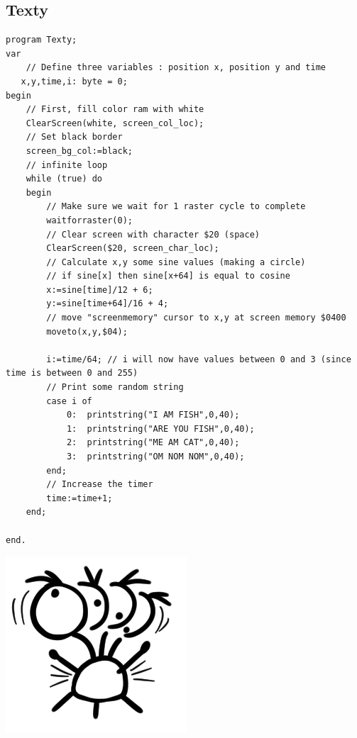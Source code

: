 \subsection{Texty}
\begin{minipage}{0.8\textwidth}
\begin{lstlisting}
program Texty;
var  
	// Define three variables : position x, position y and time
   x,y,time,i: byte = 0;  
begin
 	// First, fill color ram with white
	ClearScreen(white, screen_col_loc);
	// Set black border
	screen_bg_col:=black;
	// infinite loop
	while (true) do
	begin
		// Make sure we wait for 1 raster cycle to complete
		waitforraster(0);
		// Clear screen with character $20 (space)
		ClearScreen($20, screen_char_loc);
		// Calculate x,y some sine values (making a circle)
		// if sine[x] then sine[x+64] is equal to cosine  
		x:=sine[time]/12 + 6;		
		y:=sine[time+64]/16 + 4;		
		// move "screenmemory" cursor to x,y at screen memory $0400
		moveto(x,y,$04);
		
		i:=time/64; // i will now have values between 0 and 3 (since time is between 0 and 255)
		// Print some random string
		case i of
			0:	printstring("I AM FISH",0,40);
			1:	printstring("ARE YOU FISH",0,40);
			2:	printstring("ME AM CAT",0,40);
			3:	printstring("OM NOM NOM",0,40);
		end;
		// Increase the timer
		time:=time+1;
	end;

end.
\end{lstlisting}
\end{minipage}
\begin{minipage}{0.2\textwidth}
\includegraphics[width=\linewidth]{images/trip/trip9.png}
\end{minipage}

